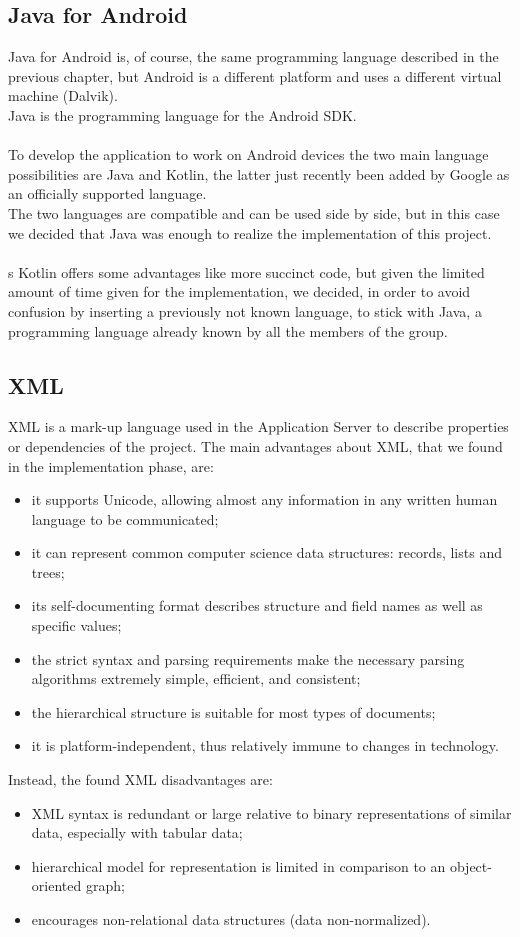 \subsection{Java for Android}
\label{subsect:Java for Android}
Java for Android is, of course, the same programming language described in the previous chapter, but Android is a different platform and uses a different virtual machine (Dalvik). \\
Java is the programming language for the Android SDK. \\\\
To develop the application to work on Android devices the two main language possibilities are Java and Kotlin, the latter just recently been added by Google as an officially supported language.\\
The two languages are compatible and can be used side by side, but in this case we decided that Java was enough to realize the implementation of this project.\\\\s
Kotlin offers some advantages like more succinct code, but given the limited amount of time given for the implementation, we decided, in order to avoid confusion by inserting a previously not known language, to stick with Java, a programming language already known by all the members of the group.
\subsection{XML}
\label{subsect:XML}
XML is a mark-up language used in the Application Server to describe properties or dependencies of the project. The main advantages about XML, that we found in the implementation phase, are:
\begin{itemize}
\item it supports Unicode, allowing almost any information in any written human language to be communicated;
\item it can represent common computer science data structures: records, lists and trees;
\item its self-documenting format describes structure and field names as well as specific values;
\item the strict syntax and parsing requirements make the necessary parsing algorithms extremely simple, efficient, and consistent;
\item the hierarchical structure is suitable for most types of documents;
\item it is platform-independent, thus relatively immune to changes in technology.
\end{itemize}
Instead, the found XML disadvantages are:
\begin{itemize}
\item XML syntax is redundant or large relative to binary representations of similar data, especially with tabular data;
\item hierarchical model for representation is limited in comparison to an object-oriented graph;
\item encourages non-relational data structures (data non-normalized).
\end{itemize}


